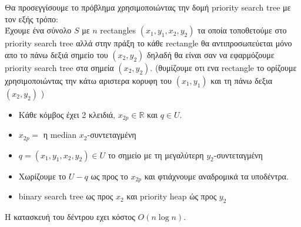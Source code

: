 \documentclass[12pt]{article}
\begin{document}
    Θα προσεγγίσουμε το πρόβλημα χρησιμοποιώντας την δομή \textlatin{priority search tree} με τον εξής τρόπο:\\
    Έχουμε ένα σύνολο $S$ με $n$ \textlatin{rectangles} $(x_1,y_1,x_2,y_2)$ τα οποία τοποθετούμε στο \textlatin{priority search tree} αλλά στην πράξη το κάθε \textlatin{rectangle} θα αντιπροσωπεύεται μόνο απο το πάνω δεξιά σημείο του $(x_2,y_2)$ δηλαδή θα είναι σαν να εφαρμόζουμε \textlatin{priority search tree} στα σημεία  $(x_2,y_2)$.
    (θυμίζουμε οτι ενα \textlatin{rectangle} το ορίζουμε χρησιμοποιώντας την κάτω αριστερα κορυφη του $(x_1,y_1)$ και τη πάνω δεξια $(x_2,y_2)$ )
    \begin{itemize}
        \item Κάθε κόμβος έχει 2 κλειδιά, $x_{2p} \in \mathbb{R}$ και $q \in U$.
        \item $x_{2p} =$ η \textlatin{median} $x_2$-συντεταγμένη
        \item $q =(x_1,y_1,x_2,y_2) \in U$ το σημείο με τη μεγαλύτερη $y_2$-συντεταγμένη
        \item Χωρίζουμε το $U - q$ ως προς το $x_{2p}$ και φτιάχνουμε αναδρομικά τα υποδέντρα.
        \item \textlatin{binary search tree} ως προς $x_2$
        και \textlatin{priority heap} ώς προς $y_2$ 
    \end{itemize}
     Η κατασκευή του δέντρου εχει κόστος $O(n\log n)$.
\end{document}
